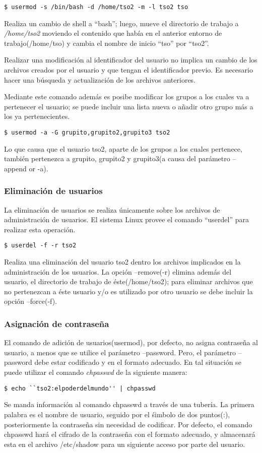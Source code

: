 \documentclass[letterpaper,10pt]{article}
\begin{document}
\begin{verbatim}
$ usermod -s /bin/bash -d /home/tso2 -m -l tso2 tso
\end{verbatim}
Realiza un cambio de shell a ``bash''; luego, mueve el directorio de trabajo a \emph{/home/tso2} moviendo el contenido que había 
en el anterior entorno de trabajo(/home/tso) y cambia el nombre de inicio ``tso'' por ``tso2''.

Realizar una modificación al identificador del usuario no implica un cambio de los archivos creados por el usuario 
y que tengan el identificador previo. Es necesario hacer una búsqueda y actualización de los archivos anteriores.

Mediante este comando además es posibe modificar los grupos a los cuales va a pertenecer el usuario; se puede
incluir una lista nueva o añadir otro grupo más a los ya pertenecientes.
\begin{verbatim}
$ usermod -a -G grupito,grupito2,grupito3 tso2
\end{verbatim}
Lo que causa que el usuario tso2, aparte de los grupos a los cuales pertenece, también pertenezca a grupito, grupito2 y
grupito3(a causa del parámetro --append or -a).

\subsubsection{Eliminación de usuarios}
La eliminación de usuarios se realiza únicamente sobre los archivos de administración de usuarios.
El sistema Linux provee el comando ``userdel'' para realizar esta operación.

\begin{verbatim}
$ userdel -f -r tso2
\end{verbatim}

Realiza una eliminación del usuario tso2 dentro los archivos implicados en la administración de los usuarios.
La opción --remove(-r) elimina además del usuario, el directorio de trabajo de éste(/home/tso2); para eliminar archivos 
que no pertenezcan a éste usuario y/o es utilizado por otro usuario se debe incluir la opción --force(-f).

\subsubsection{Asignación de contraseña}
El comando de adición de usuarios(usermod), por defecto, no asigna contraseña al usuario, a menos que se utilice
el parámetro --password. Pero, el parámetro --password debe estar codificado y en el formato adecuado.
En tal situación se puede utilizar el comando \emph{chpasswd} de la siguiente manera:
\begin{verbatim}
$ echo ``tso2:elpoderdelmundo'' | chpasswd
\end{verbatim}
Se manda información al comando chpasswd a través de una tubería. La primera palabra es el nombre de usuario,
seguido por el śimbolo de dos puntos(:), posteriormente la contraseña sin necesidad de codificar.
Por defecto, el comando chpasswd hará el cifrado de la contraseña con el formato adecuado, 
y almacenará esta en el archivo /etc/shadow para un siguiente acceso por parte del usuario.
\end{document}
